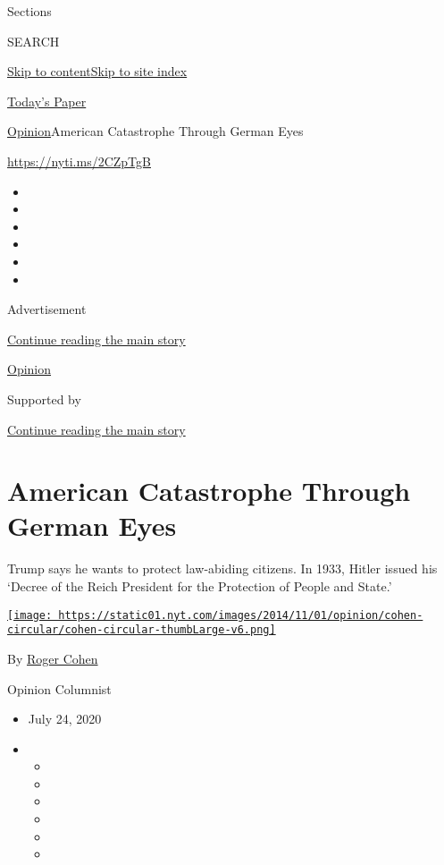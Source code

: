 Sections

SEARCH

\protect\hyperlink{site-content}{Skip to
content}\protect\hyperlink{site-index}{Skip to site index}

\href{https://myaccount.nytimes.com/auth/login?response_type=cookie\&client_id=vi}{}

\href{https://www.nytimes.com/section/todayspaper}{Today's Paper}

\href{/section/opinion}{Opinion}\textbar{}American Catastrophe Through
German Eyes

\href{https://nyti.ms/2CZpTgB}{https://nyti.ms/2CZpTgB}

\begin{itemize}
\item
\item
\item
\item
\item
\item
\end{itemize}

Advertisement

\protect\hyperlink{after-top}{Continue reading the main story}

\href{/section/opinion}{Opinion}

Supported by

\protect\hyperlink{after-sponsor}{Continue reading the main story}

\hypertarget{american-catastrophe-through-german-eyes}{%
\section{American Catastrophe Through German
Eyes}\label{american-catastrophe-through-german-eyes}}

Trump says he wants to protect law-abiding citizens. In 1933, Hitler
issued his `Decree of the Reich President for the Protection of People
and State.'

\href{https://www.nytimes.com/by/roger-cohen}{\texttt{[image: https://static01.nyt.com/images/2014/11/01/opinion/cohen-circular/cohen-circular-thumbLarge-v6.png]}}

By \href{https://www.nytimes.com/by/roger-cohen}{Roger Cohen}

Opinion Columnist

\begin{itemize}
\item
  July 24, 2020
\item
  \begin{itemize}
  \item
  \item
  \item
  \item
  \item
  \item
  \end{itemize}
\end{itemize}

